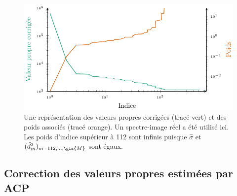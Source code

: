 \begin{figure}[ht]
    \centering
    \includegraphics[width=0.8\columnwidth]{img/chapitre3/figure2/weights_curve.pdf}
    \caption{Une représentation des valeurs propres corrigées (tracé vert) et des poids associés (tracé orange). Un spectre-image réel a été utilisé ici. Les poids d'indice supérieur à 112 sont infinis puisque $\hat{\sigma}$ et $(\hat{d}^2_{m})_{m=112,\dots,\gls{M}}$ sont égaux.
        \protect\label{fig-S_constraint}}
\end{figure}


\subsection{Correction des valeurs propres estimées par ACP}\label{subsec-3s-acp}

